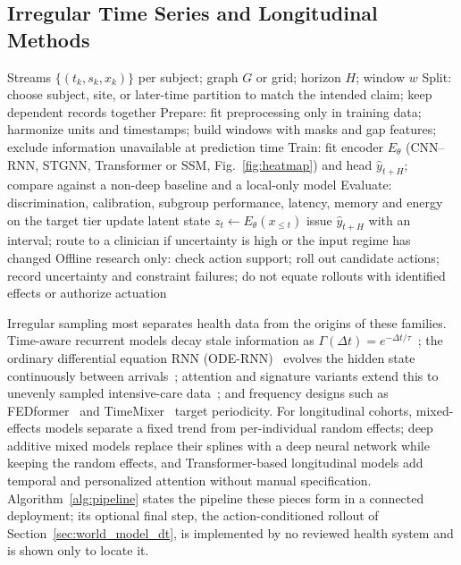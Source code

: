 \documentclass[journal]{IEEEtran}
\begin{document}
\subsection{Irregular Time Series and Longitudinal Methods}
\label{sec:longmethods}
\begin{algorithm}[t]
\caption{Spatiotemporal learning and synchronized inference in a connected deployment}
\label{alg:pipeline}
\footnotesize
\begin{algorithmic}[1]
\Require Streams $\{(t_k, s_k, x_k)\}$ per subject; graph $G$ or grid; horizon $H$; window $w$
\State Split: choose subject, site, or later-time partition to match the intended claim; keep dependent records together
\State Prepare: fit preprocessing only in training data; harmonize units and timestamps; build windows with masks and gap features; exclude information unavailable at prediction time
\State Train: fit encoder $E_\theta$ (CNN--RNN, STGNN, Transformer or SSM, Fig.~\ref{fig:heatmap}) and head $\hat{y}_{t+H}$; compare against a non-deep baseline and a local-only model
\State Evaluate: discrimination, calibration, subgroup performance, latency, memory and energy on the target tier
  \State update latent state $z_t \gets E_\theta(x_{\le t})$ 
  \State issue $\hat{y}_{t+H}$ with an interval; route to a clinician if uncertainty is high or the input regime has changed
    \State Offline research only: check action support; roll out candidate actions; record uncertainty and constraint failures; do not equate rollouts with identified effects or authorize actuation
  \EndIf
\EndFor
\end{algorithmic}
\end{algorithm}
Irregular sampling most separates health data from the origins of these families. Time-aware recurrent models decay stale information as $\Gamma(\Delta t)=e^{-\Delta t/\tau}$~\cite{metzger2023crop}; the ordinary differential equation RNN (ODE-RNN)~\cite{rubanova2019latent} evolves the hidden state continuously between arrivals~\cite{chen2018neural}; attention and signature variants extend this to unevenly sampled intensive-care data~\cite{chen2023contiformer,morenopino2024rough}; and frequency designs such as FEDformer~\cite{zhou2022fedformer} and TimeMixer~\cite{timemixer} target periodicity. For longitudinal cohorts, mixed-effects models separate a fixed trend from per-individual random effects; deep additive mixed models replace their splines with a deep neural network while keeping the random effects, and Transformer-based longitudinal models add temporal and personalized attention without manual specification. Algorithm~\ref{alg:pipeline} states the pipeline these pieces form in a connected deployment; its optional final step, the action-conditioned rollout of Section~\ref{sec:world_model_dt}, is implemented by no reviewed health system and is shown only to locate it.
\end{document}
